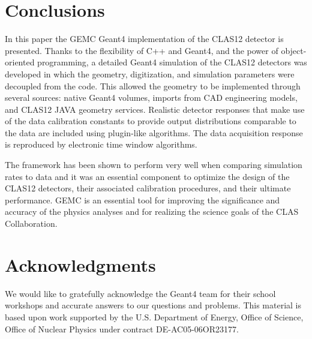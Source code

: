 \section{Conclusions}

In this paper the GEMC Geant4 implementation of the CLAS12 detector is presented. Thanks to the flexibility of
C++ and Geant4, and the power of object-oriented programming, a detailed Geant4 simulation of the CLAS12 detectors
was developed in which the geometry, digitization, and simulation parameters were decoupled from the code. This
allowed the geometry to be implemented through several sources: native Geant4 volumes, imports from CAD engineering
models, and CLAS12 JAVA geometry services. Realistic detector responses that make use of the data calibration
constants to provide output distributions comparable to the data are included using plugin-like algorithms. The data
acquisition response is reproduced by electronic time window algorithms.

The framework has been shown to perform very well when comparing simulation rates to data and it was an essential
component to optimize the design of the CLAS12 detectors, their associated calibration procedures, and their ultimate
performance. GEMC is an essential tool for improving the significance and accuracy of the physics analyses and for
realizing the science goals of the CLAS Collaboration.

\section{Acknowledgments}

We would like to gratefully acknowledge the Geant4 team for their school workshops and accurate answers to our
questions and problems. This material is based upon work supported by the U.S. Department of Energy, Office of
Science, Office of Nuclear Physics under contract DE-AC05-06OR23177.

